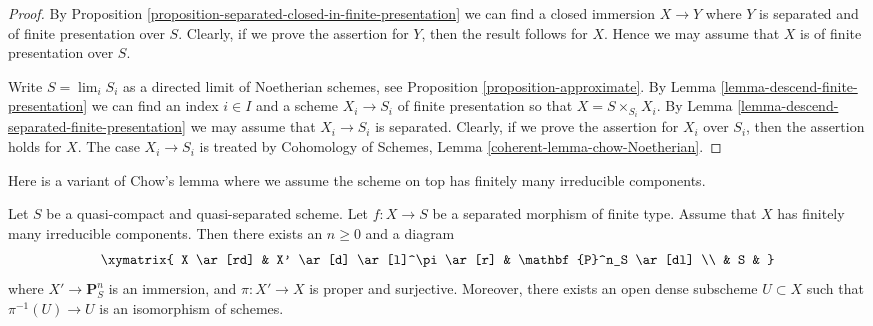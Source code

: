 \begin{proof}
By Proposition \ref{proposition-separated-closed-in-finite-presentation}
we can find a closed immersion $X \to Y$ where $Y$ is separated
and of finite presentation over $S$. Clearly, if we prove the assertion
for $Y$, then the result follows for $X$. Hence we may assume that
$X$ is of finite presentation over $S$.

\medskip\noindent
Write $S = \lim_i S_i$ as a directed limit of Noetherian schemes, see
Proposition \ref{proposition-approximate}. By
Lemma \ref{lemma-descend-finite-presentation} we can
find an index $i \in I$ and a scheme $X_i \to S_i$ of finite presentation
so that $X = S \times_{S_i} X_i$.
By Lemma \ref{lemma-descend-separated-finite-presentation}
we may assume that $X_i \to S_i$ is separated.
Clearly, if we prove the assertion for
$X_i$ over $S_i$, then the assertion holds for $X$. The case
$X_i \to S_i$ is treated by
Cohomology of Schemes, Lemma \ref{coherent-lemma-chow-Noetherian}.
\end{proof}

\noindent
Here is a variant of Chow's lemma where we assume the scheme
on top has finitely many irreducible components.

\begin{lemma}
\label{lemma-chow-EGA}
Let $S$ be a quasi-compact and quasi-separated scheme.
Let $f : X \to S$ be a separated morphism of finite type.
Assume that $X$ has finitely many irreducible components.
Then there exists an $n \geq 0$ and a diagram
$$
\xymatrix{
X \ar[rd] & X' \ar[d] \ar[l]^\pi \ar[r] & \mathbf{P}^n_S \ar[dl] \\
& S &
}
$$
where $X' \to \mathbf{P}^n_S$ is an immersion, and
$\pi : X' \to X$ is proper and surjective. Moreover, there exists
an open dense subscheme $U \subset X$ such that $\pi^{-1}(U) \to U$
is an isomorphism of schemes.
\end{lemma}


